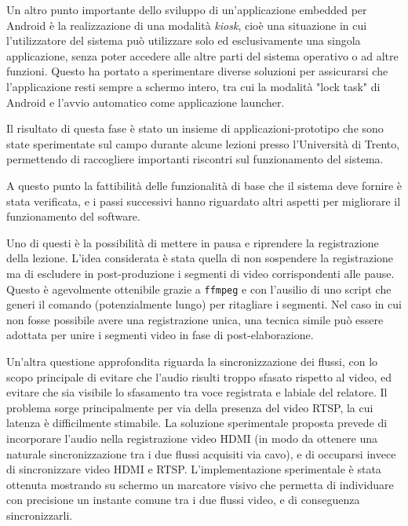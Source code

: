Un altro punto importante dello sviluppo di un'applicazione embedded per Android è la realizzazione di una modalità \textit{kiosk}, cioè una situazione in cui l'utilizzatore del sistema può utilizzare solo ed esclusivamente una singola applicazione, senza poter accedere alle altre parti del sistema operativo o ad altre funzioni. Questo ha portato a sperimentare diverse soluzioni per assicurarsi che l'applicazione resti sempre a schermo intero, tra cui la modalità "lock task" di Android e l'avvio automatico come applicazione launcher.

Il risultato di questa fase è stato un insieme di applicazioni-prototipo che sono state sperimentate sul campo durante alcune lezioni presso l'Università di Trento, permettendo di raccogliere importanti riscontri sul funzionamento del sistema.

A questo punto la fattibilità delle funzionalità di base che il sistema deve fornire è stata verificata, e i passi successivi hanno riguardato altri aspetti per migliorare il funzionamento del software.

Uno di questi è la possibilità di mettere in pausa e riprendere la registrazione della lezione. L'idea considerata è stata quella di non sospendere la registrazione ma di escludere in post-produzione i segmenti di video corrispondenti alle pause. Questo è agevolmente ottenibile grazie a \texttt{ffmpeg} e con l'ausilio di uno script che generi il comando (potenzialmente lungo) per ritagliare i segmenti. Nel caso in cui non fosse possibile avere una registrazione unica, una tecnica simile può essere adottata per unire i segmenti video in fase di post-elaborazione.

Un'altra questione approfondita riguarda la sincronizzazione dei flussi, con lo scopo principale di evitare che l'audio risulti troppo sfasato rispetto al video, ed evitare che sia visibile lo sfasamento tra voce registrata e labiale del relatore. Il problema sorge principalmente per via della presenza del video RTSP, la cui latenza è difficilmente stimabile. La soluzione sperimentale proposta prevede di incorporare l'audio nella registrazione video HDMI (in modo da ottenere una naturale sincronizzazione tra i due flussi acquisiti via cavo), e di occuparsi invece di sincronizzare video HDMI e RTSP. L'implementazione sperimentale è stata ottenuta mostrando su schermo un marcatore visivo che permetta di individuare con precisione un instante comune tra i due flussi video, e di conseguenza sincronizzarli.

